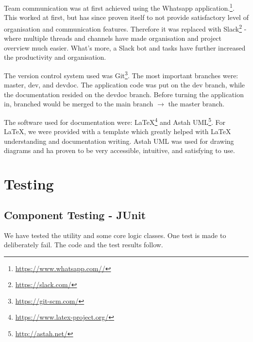 		Team communication was at first achieved using the Whatsapp application.\footnote{\url{https://www.whatsapp.com//}}. This worked at first, but has since proven itself to not provide satisfactory level of organisation and communication features. Therefore it was replaced with Slack\footnote{\url{https://slack.com/}} - where multiple threads and channels have made organisation and project overview much easier. What's more, a Slack bot and tasks have further increased the productivity and organisation.
		
		The version control system used was Git\footnote{\url{https://git-scm.com/}}. The most important branches were: master, dev, and devdoc. The application code was put on the dev branch, while the documentation resided on the devdoc branch. Before turning the application in, branched would be merged to the main branch $\rightarrow$ the master branch. 
		
		The software used for documentation were: LaTeX\footnote{\url{https://www.latex-project.org/}} and Astah UML\footnote{\url{http://astah.net/}}. For LaTeX, we were provided with a template which greatly helped with LaTeX understanding and documentation writing. Astah UML was used for drawing diagrams and ha proven to be very accessible, intuitive, and satisfying to use.
		
		\eject 
	
		\section{Testing}
	
			
			\subsection{Component Testing - JUnit}
			
			We have tested the utility and some core logic classes. One test is made to deliberately fail. The code and the test results follow.
			
